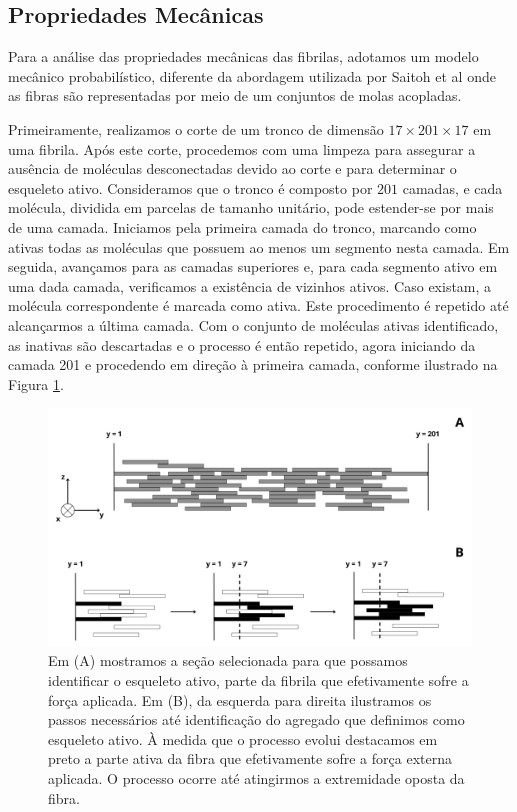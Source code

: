 \documentclass[11pt,a4paper]{article} %
\begin{document}
\subsection{Propriedades Mecânicas}  

    Para a análise das propriedades mecânicas das fibrilas, adotamos um modelo mecânico probabilístico\cite{Parkinson1997},  
    diferente da abordagem utilizada por Saitoh et al \cite{Saitoh2020MolecularDS} onde as fibras são representadas por meio de um  
    conjuntos de molas acopladas. 

    Primeiramente, realizamos o corte de um tronco de dimensão \(17 \times 201 \times 17\) em uma fibrila. Após este  
    corte, procedemos com uma limpeza para assegurar a ausência de moléculas desconectadas devido ao corte e para  
    determinar o esqueleto ativo. Consideramos que o tronco é composto por \(201\) camadas, e cada molécula, dividida  
    em parcelas de tamanho unitário, pode estender-se por mais de uma camada. Iniciamos pela primeira camada do tronco,  
    marcando como ativas todas as moléculas que possuem ao menos um segmento nesta camada. Em seguida, avançamos para  
    as camadas superiores e, para cada segmento ativo em uma dada camada, verificamos a existência de vizinhos ativos.  
    Caso existam, a molécula correspondente é marcada como ativa. Este procedimento é repetido até alcançarmos a última  
    camada. Com o conjunto de moléculas ativas identificado, as inativas são descartadas e o processo é então repetido,  
    agora iniciando da camada 201 e procedendo em direção à primeira camada, conforme ilustrado na Figura \ref{M3}.  


    \begin{figure}[H] 

        \centering 
        \includegraphics[width=\textwidth]{figures/esqueleto.png} 
        \caption{Em (A) mostramos a seção selecionada para que possamos identificar o esqueleto ativo, parte da fibrila 
        que efetivamente sofre a força aplicada. Em (B), da esquerda para direita ilustramos os passos necessários  
        até identificação do agregado que definimos como esqueleto ativo. À medida que o processo evolui destacamos  
        em preto a parte ativa da fibra que efetivamente sofre a força externa aplicada. O processo ocorre até  
        atingirmos a extremidade oposta da fibra.}   
        \label{M3} 

    \end{figure} 
\end{document}
